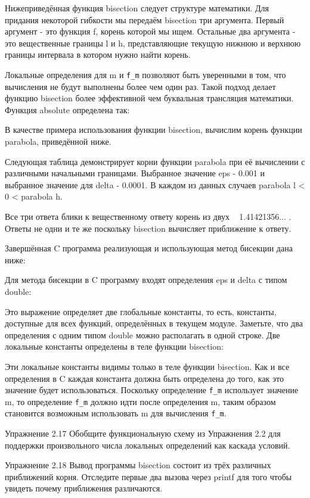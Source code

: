 Нижеприведённая функция bisection следует структуре математики. Для придания некоторой гибкости мы передаём bisection три аргумента. Первый аргумент - это функция f, корень которой мы ищем. Остальные два аргумента - это вещественные границы l и h, представляющие текущую нижнюю и верхнюю границы интервала в котором нужно найти корень.

Локальные определения для m и \lstinline|f_m| позволяют быть уверенными в том, что вычисления не будут выполнены более чем один раз. Такой подход делает функцию bisection более эффективной чем буквальная трансляция математики. Функция absolute определена так:

В качестве примера использования функции bisection, вычислим корень функции parabola, приведённой ниже.

Следующая таблица демонстрирует корни функции parabola при её вычислении с различными начальными границами. Выбранное значение eps - 0.001 и выбранное значение для delta - 0.0001. В каждом из данных случаев parabola l < 0 < parabola h.

Все три ответа блики к вещественному ответу корень из двух ~ 1.41421356... . Ответы не одни и те же поскольку bisection вычисляет приближение к ответу.

Завершённая C программа реализующая и использующая метод бисекции дана ниже:

Для метода бисекции в C программу входят определения eps и delta с типом double:

Это выражение определяет две глобальные константы, то есть, константы, доступные для всех функций, определённых в текущем модуле. Заметьте, что два определения с одним типом double можно располагать в одной строке. Две локальные константы определены в теле функции bisection:

Эти локальные константы видимы только в теле функции bisection. Как и все определения в C каждая константа должна быть определена до того, как это значение будет использоваться. Поскольку определение \lstinline|f_m| использует значение m, то определение \lstinline|f_m| должно идти после определения m, таким образом становится возможным использовать m для вычисления \lstinline|f_m|.

Упражнение 2.17 Обобщите функциональную схему из Упражнения 2.2 для поддержки произвольного числа локальных определений как каскада условий.

Упражнение 2.18 Вывод программы bisection состоит из трёх различных приближений корня. Отследите первые два вызова через printf для того чтобы увидеть почему приближения различаются.

